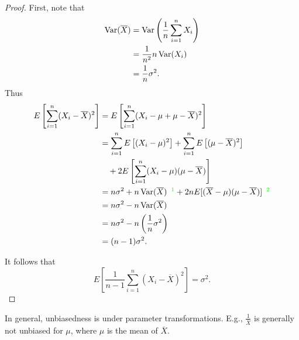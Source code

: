 \documentclass[notoc,notitlepage]{tufte-book}
\begin{document}
\begin{proof}
  First, note that
  \begin{align*}
    \operatorname{Var}(\overline{X}) &= \operatorname{Var} \left( \frac{1}{n} \sum_{i=1}^{n} X_i \right) \\
                       &= \frac{1}{n^2} n \operatorname{Var}(X_i) \\
                       &= \frac{1}{n} \sigma^2.
  \end{align*}
  Thus
  \begin{align*}
    E\left[\sum_{i=1}^{n} (X_i - \overline{X})^2\right]
    &= E \left[ \sum_{i=1}^{n} (X_i - \mu + \mu - \overline{X})^2 \right] \\
    &= \sum_{i=1}^{n} E \left[ (X_i - \mu)^2 \right] + \sum_{i=1}^{n} E \left[
    (\mu - \overline{X})^2 \right] \\
    &\quad + 2E \left[ \sum_{i=1}^{n} (X_i - \mu)(\mu - \overline{X}) \right] \\
    &= n\sigma^2 + n\Var(\overline{X}) \enspace\textcolor{green}{\footnotemark}
      + 2nE[(\overline{X}-\mu)(\mu-\overline{X})]
      \enspace\textcolor{green}{\footnotemark} \\
    &= n\sigma^2 - n\Var(\overline{X}) \\
    &= n\sigma^2 - n \left( \frac{1}{n} \sigma^2 \right) \\
    &= (n-1)\sigma^2.
  \end{align*}

  It follows that
  \begin{equation*}
    E \left[ \frac{1}{n-1} \sum_{i=1}^{n} (X_i - \overline{X})^2 \right] =
    \sigma^2.
  \end{equation*}
\end{proof}

\begin{remark}
  In general, unbiasedness is  under parameter
  transformations. E.g., $\frac{1}{\overline{X}}$ is generally not unbiased for
  $\mu$, where $\mu$ is the mean of $\overline{X}$.
\end{remark}
\end{document}
